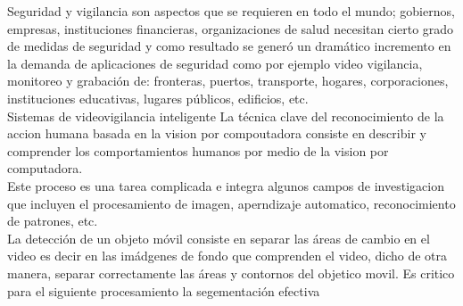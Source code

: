 Seguridad y vigilancia son aspectos que se requieren en todo el mundo; gobiernos, empresas, instituciones financieras, organizaciones de salud necesitan cierto grado de medidas de seguridad y como resultado se generó un dramático incremento en la demanda de aplicaciones de seguridad como por ejemplo video vigilancia, monitoreo y grabación de: fronteras, puertos, transporte, hogares, corporaciones, instituciones educativas, lugares públicos, edificios, etc.\\

Sistemas de videovigilancia inteligente La técnica clave del reconocimiento de la accion humana basada en la vision  por compoutadora consiste en describir y comprender los comportamientos humanos por medio de la vision por computadora.\\

Este proceso es una tarea complicada e integra algunos campos de investigacion que incluyen el procesamiento de imagen, aperndizaje automatico, reconocimiento de patrones, etc.\\

La detección de un objeto móvil consiste en separar las áreas de cambio en el video es decir en las imádgenes de fondo que comprenden el video, dicho de otra manera, separar correctamente las áreas y contornos del objetico movil. Es critico para el siguiente procesamiento la segementación efectiva \\
